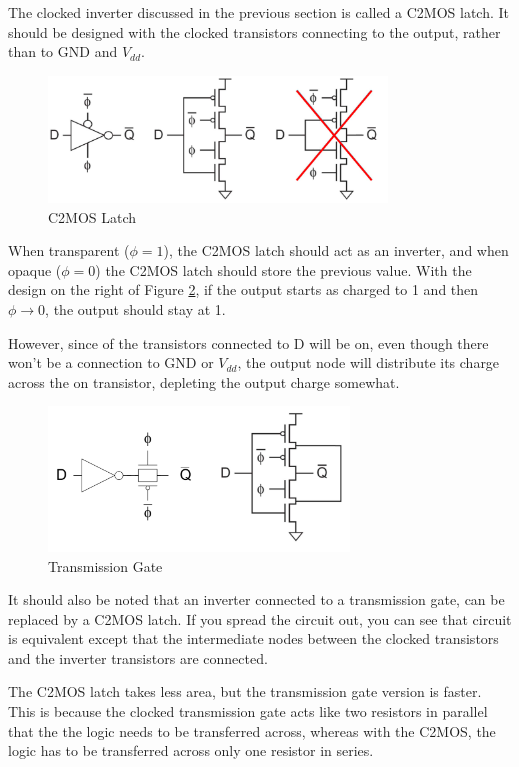 \documentclass{article}
\begin{document}
The clocked inverter discussed in the previous section is called a C2MOS latch. It should be designed with the clocked transistors connecting to the output, rather than to GND and $V_{dd}$. 

\begin{figure}[ht!]
\centering
\includegraphics[width=90mm]{C2MOS.png}
\caption{C2MOS Latch}
\label{C2MOS}
\end{figure}

When transparent ($\phi=1$), the C2MOS latch should act as an inverter, and when opaque ($\phi=0$) the C2MOS latch should store the previous value. With the design on the right of Figure \ref{C2MOS}, if the output starts as charged to 1 and then $\phi \rightarrow 0$, the output should stay at 1. 

However, since of the transistors connected to D will be on, even though there won't be a connection to GND or $V_{dd}$, the output node will distribute its charge across the on transistor, depleting the output charge somewhat. 

\begin{figure}[ht!]
\centering
\includegraphics[width=80mm]{TransmissionGate.png}
\caption{Transmission Gate}
\label{C2MOS}
\end{figure}

It should also be noted that an inverter connected to a transmission gate, can be replaced by a C2MOS latch. If you spread the circuit out, you can see that circuit is equivalent except that the intermediate nodes between the clocked transistors and the inverter transistors are connected. 

The C2MOS latch takes less area, but the transmission gate version is faster. This is because the clocked transmission gate acts like two resistors in parallel that the the logic needs to be transferred across, whereas with the C2MOS, the logic has to be transferred across only one resistor in series. 
\end{document}
